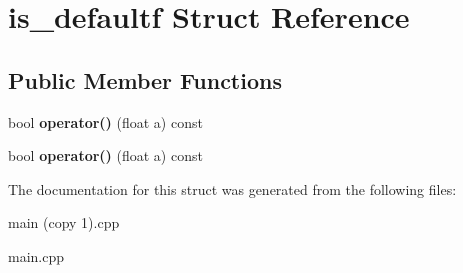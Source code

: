 \hypertarget{structis__defaultf}{}\section{is\+\_\+defaultf Struct Reference}
\label{structis__defaultf}
\subsection*{Public Member Functions}
\begin{DoxyCompactItemize}
\item 
\mbox{\label{structis__defaultf_a4bcb7c2be56a9e5390ec82c7f0df31c3}} 
bool {\bfseries operator()} (float a) const
\item 
\mbox{\label{structis__defaultf_a4bcb7c2be56a9e5390ec82c7f0df31c3}} 
bool {\bfseries operator()} (float a) const
\end{DoxyCompactItemize}


The documentation for this struct was generated from the following files\+:\begin{DoxyCompactItemize}
\item 
main (copy 1).\+cpp\item 
main.\+cpp\end{DoxyCompactItemize}
